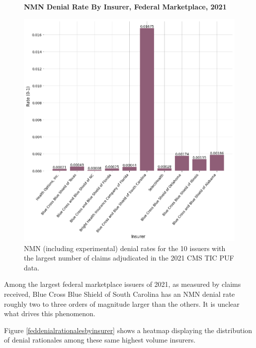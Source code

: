\documentclass[12pt, a4paper,twoside]{report}
\theoremstyle{plain} %
\theoremstyle{definition} %
\theoremstyle{remark} %
\numberwithin{equation}{chapter}
\begin{document}
		\begin{figure}[h!]
			\centering
			\textbf{NMN Denial Rate By Insurer, Federal Marketplace, 2021}\par\medskip
			\includegraphics[width=\columnwidth]{images/cms_puf/nmn_denial_rate_by_insurer.png}
			\caption{NMN (including experimental) denial rates for the 10 issuers with the largest number of claims adjudicated in the 2021 CMS TIC PUF data.}
			\label{fedinsurernmndenialrates}
		\end{figure}
	
		Among the largest federal marketplace issuers of 2021, as measured by claims received, Blue Cross Blue Shield of South Carolina has an NMN denial rate roughly two to three orders of magnitude larger than the others. It is unclear what drives this phenomenon.
		
		Figure \ref{feddenialrationalesbyinsurer} shows a heatmap displaying the distribution of denial rationales among these same highest volume insurers.
		
\end{document}
